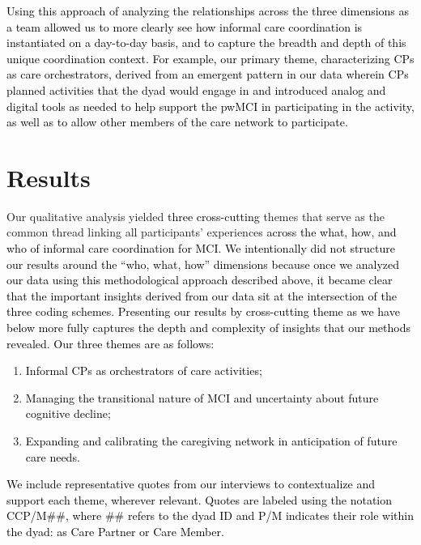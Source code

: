 \documentclass[acmsmall]{acmart}
\begin{document}
\textcolor{black}{Using this approach of analyzing the relationships across the three dimensions as a team  allowed us to more clearly see how informal care coordination is instantiated  on a day-to-day basis, and to capture the breadth and depth of this unique coordination context. For example, our primary theme, characterizing CPs as care orchestrators, derived from an emergent pattern in our data wherein CPs planned activities that the dyad would engage in and introduced analog and digital tools as needed to help support the pwMCI in participating in the activity, as well as to allow other members of the care network to participate.}

\section{Results}
Our qualitative analysis yielded \textcolor{black}{three cross-cutting} themes that serve as the common thread linking all participants’ experiences \textcolor{black}{across the what, how, and who of informal care coordination \textcolor{black}{for} MCI. We intentionally did not structure our results around the “who, what, how” dimensions because once we analyzed our data using this methodological approach described above, it became clear that the important insights derived from our data sit at the intersection of the three coding schemes. Presenting our results by cross-cutting theme as we have below more fully captures the depth and complexity of insights that our methods revealed. Our three themes are as follows:}
{\begin{enumerate}
    \item \textcolor{black}{Informal CPs as orchestrators of care activities;}
    \item \textcolor{black}{Managing the transitional nature of MCI and uncertainty about future cognitive decline;} 
    \item \textcolor{black}{Expanding and calibrating the caregiving network in anticipation of future care needs.} 
\end{enumerate}
}

\textcolor{black}{We include representative quotes from our interviews to contextualize and support each theme, wherever relevant. Quotes are labeled using the notation CCP/M\#\#, where \#\# refers to the dyad ID and P/M indicates their role within the dyad: as Care Partner or \textcolor{black}{Care} Member.}
\end{document}
